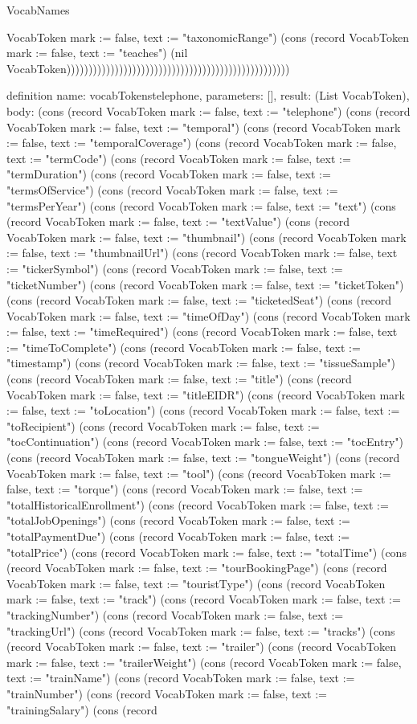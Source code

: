 \begin{lexlean}{VocabNames}
\begin{semanticmodule}
{VocabToken {mark := false, text := "taxonomicRange"}) (cons (record VocabToken {mark := false, text := "teaches"}) (nil VocabToken)))))))))))))))))))))))))))))))))))))))))))))))))))
}

definition{
  name: vocabTokenstelephone,
  parameters: [],
  result: (List VocabToken),
  body: (cons (record VocabToken {mark := false, text := "telephone"}) (cons (record VocabToken {mark := false, text := "temporal"}) (cons (record VocabToken {mark := false, text := "temporalCoverage"}) (cons (record VocabToken {mark := false, text := "termCode"}) (cons (record VocabToken {mark := false, text := "termDuration"}) (cons (record VocabToken {mark := false, text := "termsOfService"}) (cons (record VocabToken {mark := false, text := "termsPerYear"}) (cons (record VocabToken {mark := false, text := "text"}) (cons (record VocabToken {mark := false, text := "textValue"}) (cons (record VocabToken {mark := false, text := "thumbnail"}) (cons (record VocabToken {mark := false, text := "thumbnailUrl"}) (cons (record VocabToken {mark := false, text := "tickerSymbol"}) (cons (record VocabToken {mark := false, text := "ticketNumber"}) (cons (record VocabToken {mark := false, text := "ticketToken"}) (cons (record VocabToken {mark := false, text := "ticketedSeat"}) (cons (record VocabToken {mark := false, text := "timeOfDay"}) (cons (record VocabToken {mark := false, text := "timeRequired"}) (cons (record VocabToken {mark := false, text := "timeToComplete"}) (cons (record VocabToken {mark := false, text := "timestamp"}) (cons (record VocabToken {mark := false, text := "tissueSample"}) (cons (record VocabToken {mark := false, text := "title"}) (cons (record VocabToken {mark := false, text := "titleEIDR"}) (cons (record VocabToken {mark := false, text := "toLocation"}) (cons (record VocabToken {mark := false, text := "toRecipient"}) (cons (record VocabToken {mark := false, text := "tocContinuation"}) (cons (record VocabToken {mark := false, text := "tocEntry"}) (cons (record VocabToken {mark := false, text := "tongueWeight"}) (cons (record VocabToken {mark := false, text := "tool"}) (cons (record VocabToken {mark := false, text := "torque"}) (cons (record VocabToken {mark := false, text := "totalHistoricalEnrollment"}) (cons (record VocabToken {mark := false, text := "totalJobOpenings"}) (cons (record VocabToken {mark := false, text := "totalPaymentDue"}) (cons (record VocabToken {mark := false, text := "totalPrice"}) (cons (record VocabToken {mark := false, text := "totalTime"}) (cons (record VocabToken {mark := false, text := "tourBookingPage"}) (cons (record VocabToken {mark := false, text := "touristType"}) (cons (record VocabToken {mark := false, text := "track"}) (cons (record VocabToken {mark := false, text := "trackingNumber"}) (cons (record VocabToken {mark := false, text := "trackingUrl"}) (cons (record VocabToken {mark := false, text := "tracks"}) (cons (record VocabToken {mark := false, text := "trailer"}) (cons (record VocabToken {mark := false, text := "trailerWeight"}) (cons (record VocabToken {mark := false, text := "trainName"}) (cons (record VocabToken {mark := false, text := "trainNumber"}) (cons (record VocabToken {mark := false, text := "trainingSalary"}) (cons (record }
\end{semanticmodule}
\end{lexlean}

